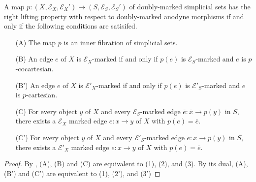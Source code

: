 \documentclass[main.tex]{subfiles}
\begin{document}
\begin{proposition}
  \label{prop:rlp_doubly-marked_anodyne}
  A map $p\colon (X, \mathcal{E}_{X}, \mathcal{E}_{X}') \to (S, \mathcal{E}_{S}, \mathcal{E}_{S}')$ of doubly-marked simplicial sets has the right lifting property with respect to doubly-marked anodyne morphisms if and only if the following conditions are satisifed.
  \begin{enumerate}
    \item[(A)] The map $p$ is an inner fibration of simplicial sets.

    \item[(B)] An edge $e$ of $X$ is $\mathcal{E}_{X}$-marked if and only if $p(e)$ is $\mathcal{E}_{S}$-marked and $e$ is $p$-cocartesian.

    \item[(B')] An edge $e$ of $X$ is $\mathcal{E}'_{X}$-marked if and only if $p(e)$ is $\mathcal{E}'_{S}$-marked and $e$ is $p$-cartesian.

    \item[(C)] For every object $y$ of $X$ and every $\mathcal{E}_{S}$-marked edge $\bar{e}\colon \bar{x} \to p(y)$ in $S$, there exists a $\mathcal{E}_{X}$ marked edge $e\colon x \to y$ of $X$ with $p(e) = \bar{e}$.

    \item[(C')] For every object $y$ of $X$ and every $\mathcal{E}'_{S}$-marked edge $\bar{e}\colon \bar{x} \to p(y)$ in $S$, there exists a $\mathcal{E}'_{X}$ marked edge $e\colon x \to y$ of $X$ with $p(e) = \bar{e}$.
  \end{enumerate}
\end{proposition}
\begin{proof}
  By \cite[Prop.\ 3.1.1.6]{highertopostheory}, (A), (B) and (C) are equivalent to (1), (2), and (3). By its dual, (A), (B') and (C') are equivalent to (1), (2'), and (3')
\end{proof}
\end{document}
